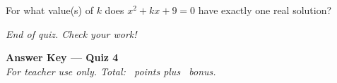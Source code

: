 \documentclass[11pt,addpoints]{exam}
\begin{document}
\begin{questions}
\bonusquestion[2]
For what value(s) of $k$ does $x^2 + kx + 9 = 0$ have exactly one real solution?
\vspace{2.5cm}

\end{questions}

\begin{center}
  \textit{End of quiz. Check your work!}
\end{center}

\newpage
\begin{center}
  {\Large\bfseries Answer Key --- Quiz 4}\\[4pt]
  \textit{For teacher use only. Total: \numpoints\ points plus \numbonuspoints\ bonus.}
\end{center}
\end{document}
